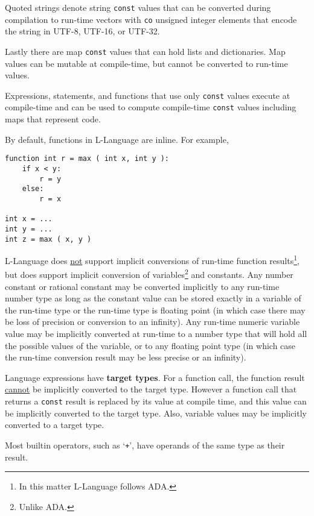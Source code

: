 \documentclass[12pt]{article}
\newcommand{\skey}[2]{{\rm \bfseries #1#2}}
\newenvironment{indpar}[1][0.3in]%
	{\begin{list}{}%
		     {\setlength{\itemsep}{0in}%
		      \setlength{\topsep}{0in}%
		      \setlength{\parsep}{1ex}%
		      \setlength{\labelwidth}{#1}%
		      \setlength{\leftmargin}{#1}%
		      \addtolength{\leftmargin}{\labelsep}}%
	 \item}%
	{\end{list}}
\begin{document}
Quoted strings denote string {\tt const} values that can be
converted during compilation to run-time vectors
with {\tt co} unsigned integer elements that encode the
string in UTF-8, UTF-16, or UTF-32.

Lastly there are map {\tt const} values that can hold lists
and dictionaries.  Map values can be mutable at compile-time,
but cannot be converted to run-time values.

Expressions, statements, and functions that use only {\tt const} values
execute at compile-time and can be used to compute compile-time
{\tt const} values including maps that represent code.

By default, functions in L-Language are inline.  For example,

\begin{indpar}\begin{verbatim}
function int r = max ( int x, int y ):
    if x < y:
        r = y
    else:
        r = x

int x = ...
int y = ...
int z = max ( x, y )
\end{verbatim}\end{indpar}

L-Language does \underline{not} support implicit conversions of
run-time function results\footnote{In this matter L-Language follows ADA.},
but does support implicit conversion of variables\footnote{Unlike ADA.}
and constants.  Any number constant or rational constant may be
converted implicitly to any run-time number type as long as
the constant value can be stored exactly in a variable
of the run-time type or the run-time type is floating point
(in which case there may be loss of precision or conversion to
an infinity).
Any run-time numeric variable value may be implicitly converted
at run-time to a number type that will hold all the possible values of
the variable, or to any floating point type
(in which case the run-time conversion result
may be less precise or an infinity).

Language expressions have \skey{target type}s.
For a function call, the function result \underline{cannot}
be implicitly converted to the target type.
However a function call that returns a {\tt const}
result is replaced by its value at compile time, and this value
can be implicitly converted to the target type.  Also, variable values
may be implicitly converted to a target type.

Most builtin operators, such as `{\tt +}',
have operands of the same type as their result.
\end{document}
